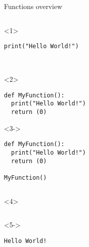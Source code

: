 \begin{frame}[fragile]{Functions overview}

  \begin{columns}[onlytextwidth]
    \begin{column}{\textwidth}
      \begin{onlyenv}<1>
        \begin{lstlisting}[style=python,title={functions1.py}]
print("Hello World!")



 \end{lstlisting}
      \end{onlyenv}

      \begin{onlyenv}<2>
        \begin{lstlisting}[style=python,title={functions1.py}]
def MyFunction():
  print("Hello World!")
  return (0)

 \end{lstlisting}
      \end{onlyenv}

      \begin{onlyenv}<3->
        \begin{lstlisting}[style=python,title={functions1.py}]
def MyFunction():
  print("Hello World!")
  return (0)

MyFunction() \end{lstlisting}
      \end{onlyenv}
    \end{column}
  \end{columns}

    \begin{columns}[onlytextwidth]
    \begin{column}{\textwidth}
      \begin{onlyenv}<4>
        \begin{lstlisting}[style=sh]
%*\LSTPrompt*) python functions1.py
 \end{lstlisting}
      \end{onlyenv}

      \begin{onlyenv}<5->
        \begin{lstlisting}[style=sh]
%*\LSTPrompt*) python functions1.py
Hello World! \end{lstlisting}
      \end{onlyenv}
    \end{column}
  \end{columns}
\end{frame}


